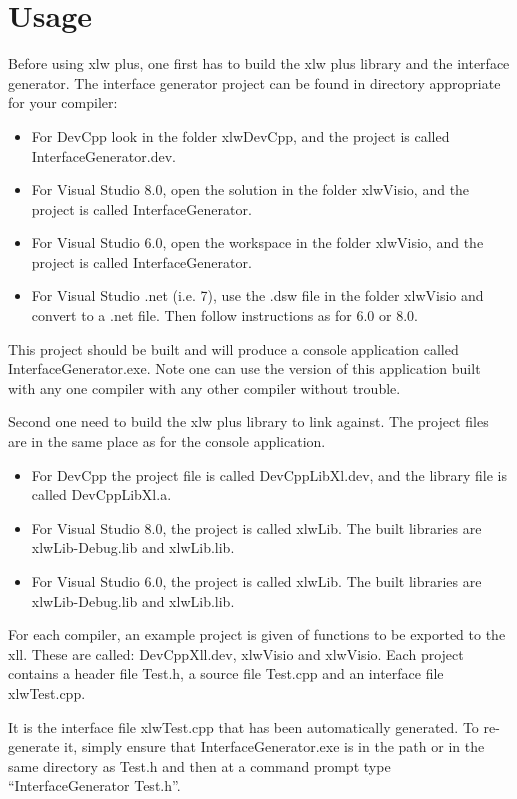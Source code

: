 \documentclass[12pt,reqno]{amsart}
\numberwithin{equation}{section}
\numberwithin{figure}{section}
\begin{document}
\section{Usage}

Before using xlw plus, one first has to build the xlw plus library and
the interface generator. The interface generator project can be found
in directory appropriate for your compiler:
\begin{itemize}
\item For DevCpp look in the folder xlwDevCpp, and the project is
  called InterfaceGenerator.dev.
\item For Visual Studio 8.0, open the solution in the folder xlwVisio, and the
  project is called InterfaceGenerator. 
\item For Visual Studio 6.0, open the workspace in the folder
  xlwVisio, and the project is called InterfaceGenerator. 
\item For Visual Studio .net (i.e. 7), use the .dsw file in the folder
  xlwVisio and convert to a .net file. Then follow instructions as for
  6.0 or 8.0.
\end{itemize}
This project should be built and will produce a console application
called InterfaceGenerator.exe. Note one can use the version of this
application built with any one compiler with any other compiler
without trouble. 

Second one need to build the xlw plus library to link against. The
project files are in the same place as for the console application. 
\begin{itemize}
\item For DevCpp the project file is called DevCppLibXl.dev, 
and the
  library file is called  DevCppLibXl.a. 
\item For Visual Studio 8.0, the project is called xlwLib. The built
  libraries are xlwLib-Debug.lib and xlwLib.lib. 
\item For Visual Studio 6.0, the project is called xlwLib. The built
  libraries are xlwLib-Debug.lib and xlwLib.lib. 
\end{itemize}

For each compiler, an example project is given of functions to be
exported to the xll. These are called: DevCppXll.dev, xlwVisio and
xlwVisio. Each project contains a header file Test.h, a source file
Test.cpp and an interface file xlwTest.cpp.

It is the interface file xlwTest.cpp that has been automatically
generated. To re-generate it, simply ensure that
InterfaceGenerator.exe is in the path or in the same directory as
Test.h and then at a command prompt type ``InterfaceGenerator Test.h''. 
\end{document}
